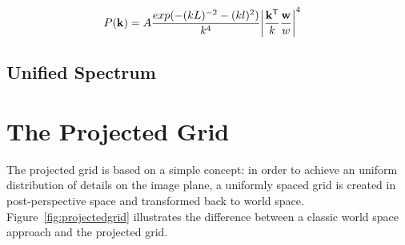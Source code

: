 \begin{align}
  P(\mvec{k}) &=
A\frac{exp(-(kL)^{-2}-(kl)^2)}{k^4}\abs*{\frac{\transpose{\mvec{k}}}{k}\frac{
\mvec{w}}{w}}^4
\end{align}

\subsection{Unified Spectrum}
\label{sec_unified_spectrum}

\section{The Projected Grid}
\label{sec_projected_grid}
The projected grid is based on a simple concept: in order to achieve an
uniform distribution of details on the image plane, a uniformly spaced grid is
created in post-perspective space and transformed back to world space.
Figure~\ref{fig:projectedgrid} illustrates the difference between a classic
world space approach and the projected grid.
